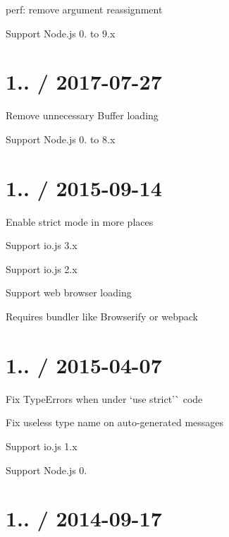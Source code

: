 
\begin{DoxyItemize}
\item perf\+: remove argument reassignment
\item Support Node.\+js 0. to 9.\+x
\end{DoxyItemize}

\section*{1.. / 2017-\/07-\/27 }


\begin{DoxyItemize}
\item Remove unnecessary {\ttfamily Buffer} loading
\item Support Node.\+js 0. to 8.\+x
\end{DoxyItemize}

\section*{1.. / 2015-\/09-\/14 }


\begin{DoxyItemize}
\item Enable strict mode in more places
\item Support io.\+js 3.\+x
\item Support io.\+js 2.\+x
\item Support web browser loading
\begin{DoxyItemize}
\item Requires bundler like Browserify or webpack
\end{DoxyItemize}
\end{DoxyItemize}

\section*{1.. / 2015-\/04-\/07 }


\begin{DoxyItemize}
\item Fix {\ttfamily Type\+Error}s when under `\textquotesingle{}use strict'\`{} code
\item Fix useless type name on auto-\/generated messages
\item Support io.\+js 1.\+x
\item Support Node.\+js 0.
\end{DoxyItemize}

\section*{1.. / 2014-\/09-\/17 }


